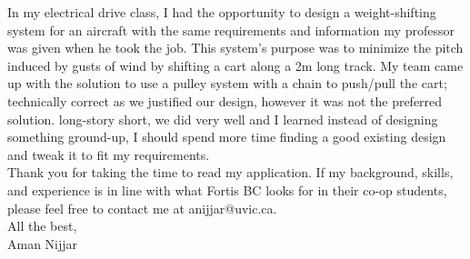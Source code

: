 \documentclass[10pt,a4paper,ragged2e,withhyper]{altacv}
\newcommand{\company}{Fortis BC}
\begin{document}
In my electrical drive class, I had the opportunity to design a weight-shifting system for an aircraft with the same requirements and information my professor was given when he took the job. This system's purpose was to minimize the pitch induced by gusts of wind by shifting a cart along a 2m long track. My team came up with the solution to use a pulley system with a chain to push/pull the cart; technically correct as we justified our design, however it was not the preferred solution. long-story short, we did very well and I learned instead of designing something ground-up, I should spend more time finding a good  existing design and tweak it to fit my requirements.  \linebreak \\



Thank you for taking the time to read my application. If my background, skills, and experience is in line with what {\company} looks for in their co-op students, please feel free to contact me at anijjar@uvic.ca. \linebreak \linebreak \\ %

All the best, \linebreak \linebreak \\

Aman Nijjar 
\end{document}
